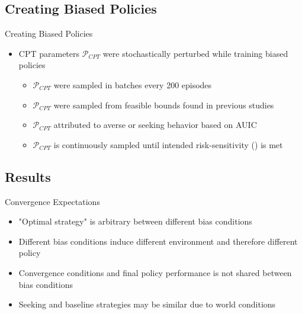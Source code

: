 \documentclass[aspectratio=1610, xcolor=dvipsnames]{packages/beamer}
\begin{document}
\subsection{Creating Biased Policies}\begin{frame}{Creating Biased Policies}
    \begin{itemize}
        \item \Ac{CPT} parameters $\mathcal{P}_{CPT}$ were stochastically perturbed while training biased policies
        \begin{itemize}
            \item $\mathcal{P}_{CPT}$ were sampled in batches every 200 episodes
            \item $\mathcal{P}_{CPT}$ were sampled from feasible bounds found in previous studies
            \item $\mathcal{P}_{CPT}$ attributed to averse or seeking behavior based on \ac{AUIC}
            \item $\mathcal{P}_{CPT}$ is continuously sampled until intended risk-sensitivity () is met
        \end{itemize}

    \end{itemize}
\end{frame}



\subsection{Results}
\begin{frame}{Convergence Expectations}
    \begin{itemize}
        \item "Optimal strategy" is arbitrary between different bias conditions
        \item Different bias conditions induce different environment and therefore different policy
        \item Convergence conditions and final policy performance is not shared between bias conditions
        \item Seeking and baseline strategies may be similar due to world conditions
    \end{itemize}
\end{frame}
\end{document}
